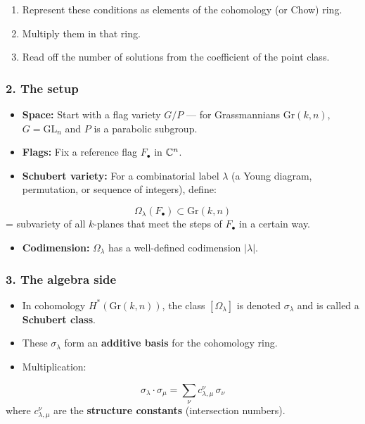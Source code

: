 \documentclass{amsart}
\let\originalmathbb\mathbb
\renewcommand{\mathbb}[1]{%
    \ifstrequal{#1}{1}{\mathbbm{#1}}{\originalmathbb{#1}}%
}
\theoremstyle{plain}
\theoremstyle{definition}
\theoremstyle{remark}
\begin{document}
\begin{enumerate}
	\item Represent these conditions as elements of the cohomology (or Chow) ring.
	\item Multiply them in that ring.
	\item Read off the number of solutions from the coefficient of the point class.
\end{enumerate}

\subsubsection{2. \textbf{The setup}}

\begin{itemize}
	\item \textbf{Space:} Start with a flag variety $G/P$ — for Grassmannians $\mathrm{Gr}(k,n)$, $G = \mathrm{GL}_n$ and $P$ is a parabolic subgroup.
	\item \textbf{Flags:} Fix a reference flag $F_\bullet$ in $\mathbb{C}^n$.
	\item \textbf{Schubert variety:} For a combinatorial label $\lambda$ (a Young diagram, permutation, or sequence of integers), define:
\end{itemize}
\[
\Omega_\lambda(F_\bullet) \subset \mathrm{Gr}(k,n)
\]
= subvariety of all $k$-planes that meet the steps of $F_\bullet$ in a certain way.

\begin{itemize}
	\item \textbf{Codimension:} $\Omega_\lambda$ has a well-defined codimension $|\lambda|$.
\end{itemize}

\subsubsection{3. \textbf{The algebra side}}

\begin{itemize}
	\item In cohomology $H^*(\mathrm{Gr}(k,n))$, the class $[\Omega_\lambda]$ is denoted $\sigma_\lambda$ and is called a \textbf{Schubert class}.
	\item These $\sigma_\lambda$ form an \textbf{additive basis} for the cohomology ring.
	\item Multiplication:
\end{itemize}
\[
\sigma_\lambda \cdot \sigma_\mu = \sum_{\nu} c_{\lambda,\mu}^\nu \, \sigma_\nu
\]
where $c_{\lambda,\mu}^\nu$ are the \textbf{structure constants} (intersection numbers).
\end{document}

